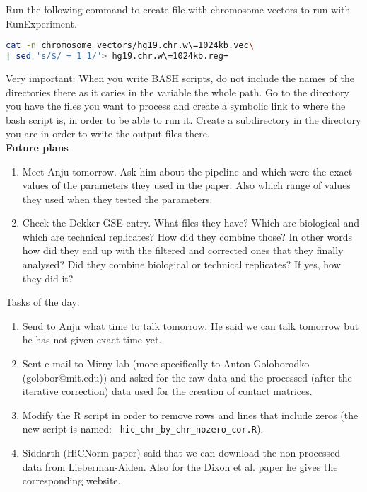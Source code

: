 \documentclass[idxtotoc,hyperref,openany]{labbook} %
\begin{document}
    Run the following command to create file with chromosome vectors to run with RunExperiment.

\begin{lstlisting}[language=bash]
cat -n chromosome_vectors/hg19.chr.w\=1024kb.vec\
| sed 's/$/ + 1 1/'> hg19.chr.w\=1024kb.reg+
\end{lstlisting}

Very important: When you write BASH scripts, do not include the names of the directories there as it caries in the variable the whole path. Go to the directory you have the files you want to process and create a symbolic link to where the bash script is, in order to be able to run it. Create a subdirectory in the directory you are in order to write the output files there.\\

\newpage
\textbf{Future plans}

\begin{enumerate}
	\item Meet Anju tomorrow. Ask him about the pipeline and which were the exact values of the parameters they used in the paper. Also which range of values they used when they tested the parameters.
	\item Check the Dekker GSE entry. What files they have? Which are biological and which are technical replicates? How did they combine those? In other words how did they end up with the filtered and corrected ones that they finally analysed? Did they combine biological or technical replicates? If yes, how they did it?
\end{enumerate}




Tasks of the day:

\begin{enumerate}
	\item Send to Anju what time to talk tomorrow. He said
	we can talk tomorrow but he has not given exact time yet.
	\item Sent e-mail to Mirny lab (more specifically to Anton Goloborodko (golobor@mit.edu)) and asked for the raw data and the processed (after the iterative correction) data used for the creation of contact matrices.
	\item Modify the R script in order to remove rows and lines that include zeros (the new script is named: ~\texttt{hic\_chr\_by\_chr\_nozero\_cor.R}).
	\item Siddarth (HiCNorm paper) said that we can download the non-processed data from Lieberman-Aiden. Also for the Dixon et al. paper 
	he gives the corresponding website.
\end{enumerate}
\end{document}
